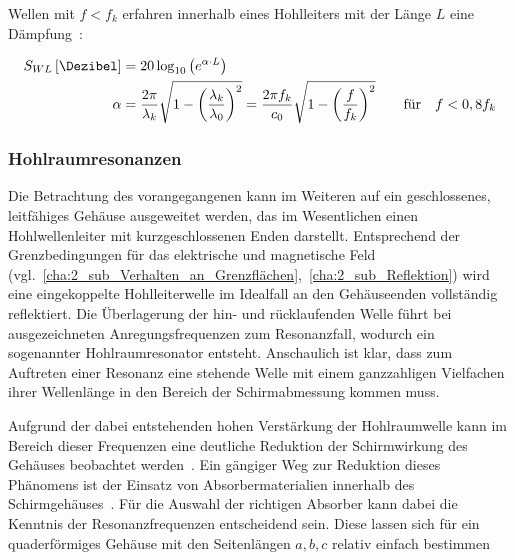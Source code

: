 \par
\vspace{\linespace}
Wellen mit $f < f_k$ erfahren innerhalb eines Hohlleiters mit der Länge $L$ eine Dämpfung~\cite{EM_Schirmung}:

\begin{align}
    S_{WL} \left[\si{\Dezibel}\right] &= 20\log_{10}\left(e^{\alpha\cdot L}\right)  \\
    \alpha &= \frac{2\pi}{\lambda_k} \sqrt{1-\left(\frac{\lambda_k}{\lambda_0}\right)^2} = \frac{2\pi f_k}{c_0} \sqrt{1-\left(\frac{f}{f_k}\right)^2} \qquad \text{für} \quad f < 0,8 f_k
\end{align}




\subsubsection{Hohlraumresonanzen}\label{cha:2_subsub_Hohlraumresonanzen}

Die Betrachtung des vorangegangenen \Abschnitts{} kann im Weiteren auf ein geschlossenes, leitfähiges Gehäuse ausgeweitet werden, das im Wesentlichen einen Hohlwellenleiter mit kurzgeschlossenen Enden darstellt. Entsprechend der Grenzbedingungen für das elektrische und magnetische Feld (vgl.~\Abschnitte\ref{cha:2_sub_Verhalten_an_Grenzflächen},~\ref{cha:2_sub_Reflektion}) wird eine eingekoppelte Hohlleiterwelle im Idealfall an den Gehäuseenden vollständig reflektiert. Die Überlagerung der hin- und rücklaufenden Welle führt bei ausgezeichneten Anregungsfrequenzen zum Resonanzfall, wodurch ein sogenannter Hohlraumresonator entsteht. Anschaulich ist klar, dass zum Auftreten einer Resonanz eine stehende Welle mit einem ganzzahligen Vielfachen ihrer Wellenlänge in den Bereich der Schirmabmessung kommen muss.
\par
\vspace{\linespace}
Aufgrund der dabei entstehenden hohen Verstärkung der Hohlraumwelle kann im Bereich dieser Frequenzen eine deutliche Reduktion der Schirmwirkung des Gehäuses beobachtet werden~\cite{EM_Schirmung}. Ein gängiger Weg zur Reduktion dieses Phänomens ist der Einsatz von Absorbermaterialien innerhalb des Schirmgehäuses~\cite{EM_Schirmung}. Für die Auswahl der richtigen Absorber kann dabei die Kenntnis der Resonanzfrequenzen entscheidend sein. Diese lassen sich für ein quaderförmiges Gehäuse mit den Seitenlängen $a, b, c$ relativ einfach bestimmen~\cite{Klassische_Elektrodynamik}

